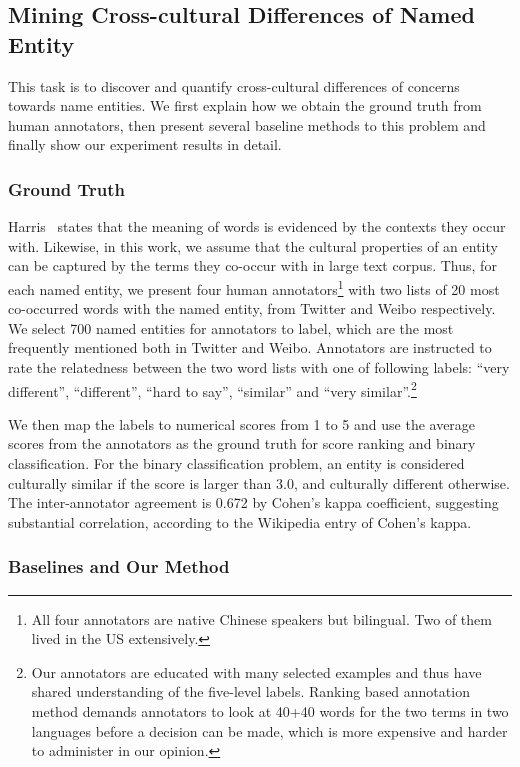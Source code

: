 \subsection{Mining Cross-cultural Differences of Named Entity}
\label{sec:mcdne}
This task is to discover and quantify cross-cultural differences of concerns towards name entities. 
We first explain how we obtain the ground truth from human annotators, then present several baseline methods to this problem and finally 
show our experiment results in detail.

\subsubsection{Ground Truth}
\label{sec:mcdne_truth}
Harris~ states that the meaning of 
words is evidenced by the contexts they occur with. 
Likewise, in this work, we assume that the cultural properties of an entity 
can be captured by the terms they co-occur with in large text corpus. 
Thus, for each named entity, we present four human annotators\footnote{All four annotators are native Chinese speakers but bilingual. Two of them lived in the US extensively.} with two lists of 20 most co-occurred words with 
the named entity, from Twitter and Weibo respectively. 
We select 700 named entities for annotators to label, which
are the most frequently mentioned both in Twitter and Weibo. 
Annotators are instructed to rate the relatedness between the 
two word lists with one of following labels: ``very different'', 
``different'', ``hard to say'',  ``similar'' and 
``very similar''.\footnote{Our annotators are educated with many 
selected examples and thus have shared understanding of the five-level 
labels. Ranking based annotation method demands annotators to look 
at 40+40 words for the two terms in two languages before a decision can
be made, which is more expensive and harder to administer in our opinion.}

We then map the labels to numerical scores from 1 to 5
and use the average scores from the annotators as the ground truth 
for score ranking and binary classification.
For the binary classification problem, 
an entity is considered culturally similar 
if the score is larger than 3.0, and culturally different otherwise.
The inter-annotator agreement is 0.672 by Cohen's kappa coefficient, 
suggesting substantial correlation, according to the Wikipedia entry
of Cohen's kappa.

\subsubsection{Baselines and Our Method}

